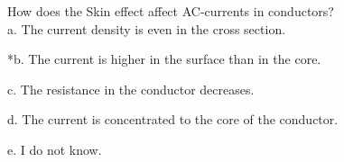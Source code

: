 
How does the Skin effect affect AC-currents in conductors?\\

a. The current density is even in the cross section.

*b. The current is higher in the surface than in the core.

c. The resistance in the conductor decreases.

d. The current is concentrated to the core of the conductor.

e. I do not know.\\
